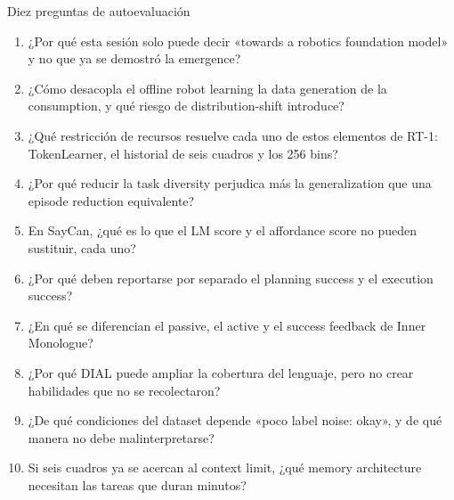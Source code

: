 \begin{importantbox}{Diez preguntas de autoevaluación}
\begin{enumerate}
  \item ¿Por qué esta sesión solo puede decir «towards a robotics foundation model» y no que ya se demostró la emergence?
  \item ¿Cómo desacopla el offline robot learning la data generation de la consumption, y qué riesgo de distribution-shift introduce?
  \item ¿Qué restricción de recursos resuelve cada uno de estos elementos de RT-1: TokenLearner, el historial de seis cuadros y los 256 bins?
  \item ¿Por qué reducir la task diversity perjudica más la generalization que una episode reduction equivalente?
  \item En SayCan, ¿qué es lo que el LM score y el affordance score no pueden sustituir, cada uno?
  \item ¿Por qué deben reportarse por separado el planning success y el execution success?
  \item ¿En qué se diferencian el passive, el active y el success feedback de Inner Monologue?
  \item ¿Por qué DIAL puede ampliar la cobertura del lenguaje, pero no crear habilidades que no se recolectaron?
  \item ¿De qué condiciones del dataset depende «poco label noise: okay», y de qué manera no debe malinterpretarse?
  \item Si seis cuadros ya se acercan al context limit, ¿qué memory architecture necesitan las tareas que duran minutos?
\end{enumerate}
\end{importantbox}



